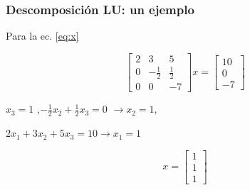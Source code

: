 \documentclass[xcolor=svgnames]{beamer} %
\theoremstyle{plain}
\theoremstyle{definition}
\begin{document}
\begin{frame}
\frametitle{Descomposición LU: un ejemplo}
Para la ec. \ref{eq:x}

$$\begin{bmatrix}
2 			& 3 				& 5 \\
0			& -\frac{1}{2} 	& \frac{1}{2} \\
0		 	& 0 				& -7 
\end{bmatrix} x = \begin{bmatrix}
10\\ 
0\\
-7
\end{bmatrix} $$

\begin{minipage}{.6\linewidth}
\pause

$x_3 = 1$ ,\pause $-\frac{1}{2} x_2 +\frac{1}{2} x_3 = 0$ \pause $\rightarrow x_2 = 1$, \pause 

$2 x_1 +3 x_2 + 5 x_3 = 10 \rightarrow x_1 =1$ 

\end{minipage} \vline  \begin{minipage}{.3\linewidth}
$$\boxed{x = \begin{bmatrix}
1\\
1\\
1
\end{bmatrix} }$$
\end{minipage}

\end{frame}
\end{document}
